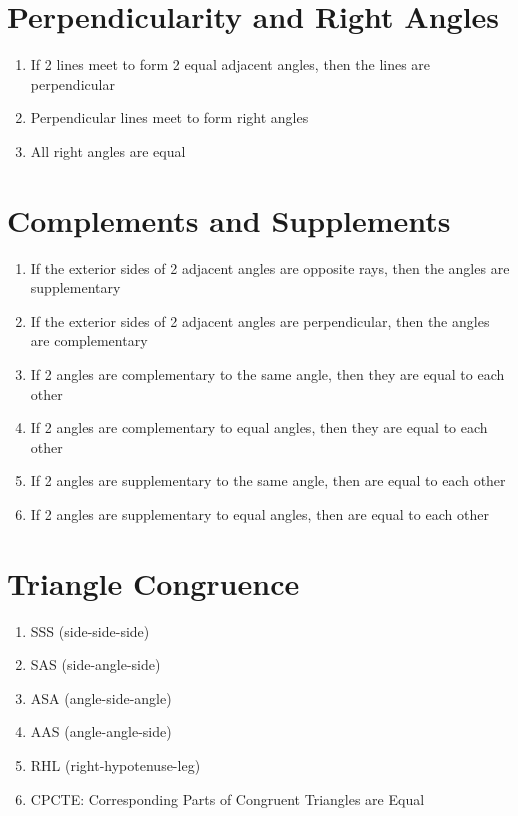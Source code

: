 \documentclass[11pt,letterpaper]{report}
\begin{document}
\section*{Perpendicularity and Right Angles}
\begin{enumerate}
    \item If 2 lines meet to form 2 equal adjacent angles, then the lines are perpendicular
    \item Perpendicular lines meet to form right angles
    \item All right angles are equal
\end{enumerate}

\section*{Complements and Supplements}
\begin{enumerate}
    \item If the exterior sides of 2 adjacent angles are opposite rays, then the angles are supplementary
    \item If the exterior sides of 2 adjacent angles are perpendicular, then the angles are complementary
    \item If 2 angles are complementary to the same angle, then they are equal to each other
    \item If 2 angles are complementary to equal angles, then they are equal to each other
    \item If 2 angles are supplementary to the same angle, then are equal to each other
    \item If 2 angles are supplementary to equal angles, then are equal to each other
\end{enumerate}

\section*{Triangle Congruence}
\begin{enumerate}
    \item SSS (side-side-side)
    \item SAS (side-angle-side)
    \item ASA (angle-side-angle)
    \item AAS (angle-angle-side)
    \item RHL (right-hypotenuse-leg)
    \item CPCTE: Corresponding Parts of Congruent Triangles are Equal
\end{enumerate}
\end{document}
